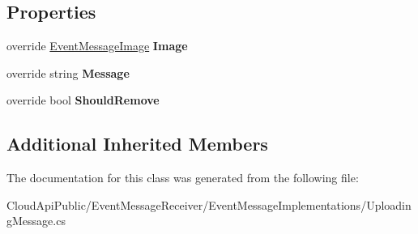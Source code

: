 \subsection*{Properties}
\begin{DoxyCompactItemize}
\item 
\hypertarget{class_cloud_api_public_1_1_event_message_receiver_1_1_uploading_message_a03cb2e79b3daae0b20eee74358e8b153}{override \hyperlink{namespace_cloud_api_public_1_1_static_aefcc1e7e1c81366ec3f6affd41c1f817}{Event\-Message\-Image} {\bfseries Image}}\label{class_cloud_api_public_1_1_event_message_receiver_1_1_uploading_message_a03cb2e79b3daae0b20eee74358e8b153}

\item 
\hypertarget{class_cloud_api_public_1_1_event_message_receiver_1_1_uploading_message_af72ea33c116de3e2d69e67218e32b1c0}{override string {\bfseries Message}}\label{class_cloud_api_public_1_1_event_message_receiver_1_1_uploading_message_af72ea33c116de3e2d69e67218e32b1c0}

\item 
\hypertarget{class_cloud_api_public_1_1_event_message_receiver_1_1_uploading_message_a0c4474eb7ebb36b91b16f5937a2c0ea4}{override bool {\bfseries Should\-Remove}}\label{class_cloud_api_public_1_1_event_message_receiver_1_1_uploading_message_a0c4474eb7ebb36b91b16f5937a2c0ea4}

\end{DoxyCompactItemize}
\subsection*{Additional Inherited Members}


The documentation for this class was generated from the following file\-:\begin{DoxyCompactItemize}
\item 
Cloud\-Api\-Public/\-Event\-Message\-Receiver/\-Event\-Message\-Implementations/Uploading\-Message.\-cs\end{DoxyCompactItemize}
